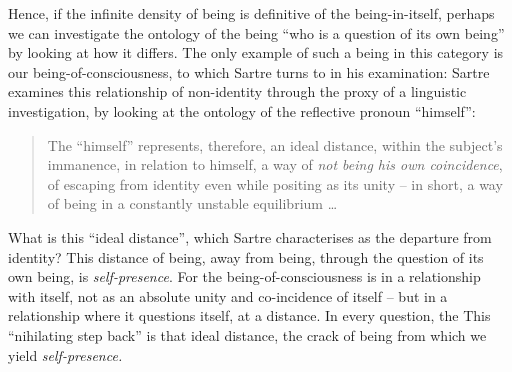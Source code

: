 Hence, if the infinite density of being is definitive of the being-in-itself, perhaps we can investigate the ontology of the being \enquote{who is a question of its own being} by looking at how it differs. The only example of such a being in this category is our being-of-consciousness, to which Sartre turns to in his examination:  
%
%
%
%
Sartre examines this relationship of non-identity through the proxy of a linguistic investigation, by looking at the ontology of the reflective pronoun \enquote{himself}:

\blockcquote[126]{Sartre}{%
    The \enquote{himself} represents, therefore, an ideal distance, within the subject's immanence, in relation to himself, a way of \emph{not being his own coincidence}, of escaping from identity even while positing as its unity -- in short, a way of being in a constantly unstable equilibrium \ldots\
}

\noindent
What is this \enquote{ideal distance}, which Sartre characterises as the departure from identity? This distance of being, away from being, through the question of its own being, is \emph{self-presence}. For the being-of-consciousness is in a relationship with itself, not as an absolute unity and co-incidence of itself -- but in a relationship where it questions itself, at a distance. In every question, the  This \enquote{nihilating step back} is that ideal distance, the crack of being from which we yield \emph{self-presence.}

